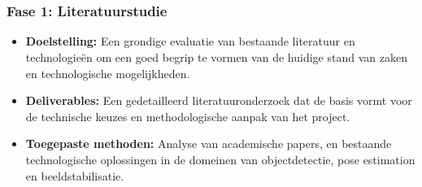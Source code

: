 
\chapter{}%
\label{ch:methodologie}

\subsection{Fase 1: Literatuurstudie}
\begin{itemize}
\item \textbf{Doelstelling:} Een grondige evaluatie van bestaande literatuur en technologieën om een goed begrip te vormen van de huidige stand van zaken en technologische mogelijkheden.
\item \textbf{Deliverables:} Een gedetailleerd literatuuronderzoek dat de basis vormt voor de technische keuzes en methodologische aanpak van het project.
\item \textbf{Toegepaste methoden:} Analyse van academische papers, en bestaande technologische oplossingen in de domeinen van objectdetectie, pose estimation en beeldstabilisatie.
\end{itemize}
